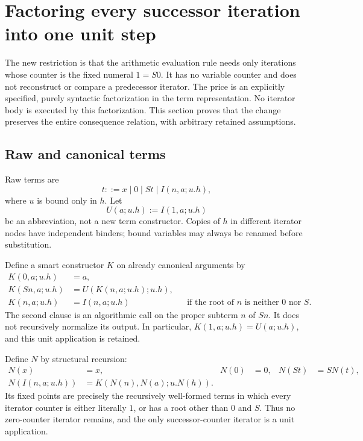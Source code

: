 
\section{Factoring every successor iteration into one unit step}

The new restriction is that the arithmetic evaluation rule needs only
iterations whose counter is the fixed numeral $1=S0$.  It has no variable
counter and does not reconstruct or compare a predecessor iterator.
The price is an explicitly specified, purely syntactic factorization in
the term representation.  No iterator body is executed by this
factorization.  This section proves that the change preserves the entire
consequence relation, with arbitrary retained assumptions.

\subsection{Raw and canonical terms}

Raw terms are
\[
 t ::= x\mid 0\mid St\mid I(n,a;u.h),
\]
where $u$ is bound only in $h$.  Let
\[
 U(a;u.h):=I(1,a;u.h)
\]
be an abbreviation, not a new term constructor.  Copies of $h$ in
different iterator nodes have independent binders; bound variables may
always be renamed before substitution.

Define a smart constructor $K$ on already canonical arguments by
\begin{align*}
 K(0,a;u.h)&=a,\\
 K(Sn,a;u.h)&=U(K(n,a;u.h);u.h),\\
 K(n,a;u.h)&=I(n,a;u.h)
       &&\text{if the root of $n$ is neither $0$ nor $S$.}
\end{align*}
The second clause is an algorithmic call on the proper subterm $n$ of
$Sn$.  It does not recursively normalize its output.  In particular,
$K(1,a;u.h)=U(a;u.h)$, and this unit application is retained.

Define $N$ by structural recursion:
\begin{align*}
 N(x)&=x,&N(0)&=0,&N(St)&=S N(t),\\
 N(I(n,a;u.h))&=K(N(n),N(a);u.N(h)).
\end{align*}
Its fixed points are precisely the recursively well-formed terms in
which every iterator counter is either literally $1$, or has a root
other than $0$ and $S$.  Thus no zero-counter iterator remains, and the
only successor-counter iterator is a unit application.

